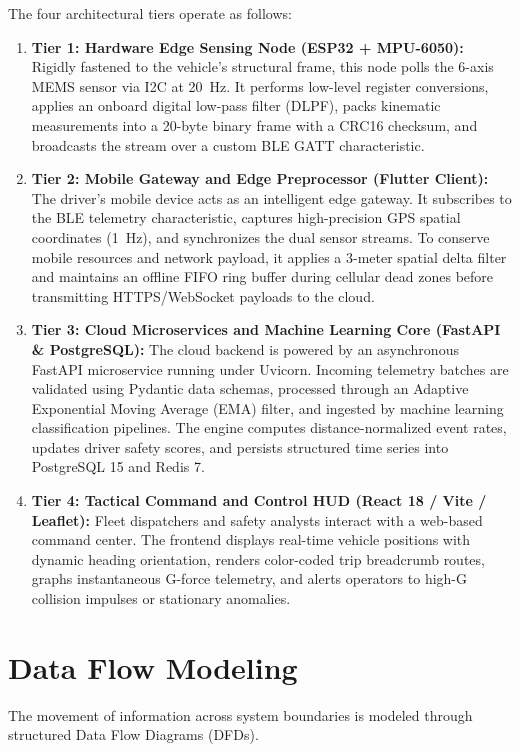 The four architectural tiers operate as follows:
\begin{enumerate}
    \item \textbf{Tier 1: Hardware Edge Sensing Node (ESP32 + MPU-6050):} 
    Rigidly fastened to the vehicle's structural frame, this node polls the 6-axis MEMS sensor via I2C at 20~Hz. It performs low-level register conversions, applies an onboard digital low-pass filter (DLPF), packs kinematic measurements into a 20-byte binary frame with a CRC16 checksum, and broadcasts the stream over a custom BLE GATT characteristic.
    
    \item \textbf{Tier 2: Mobile Gateway and Edge Preprocessor (Flutter Client):}
    The driver's mobile device acts as an intelligent edge gateway. It subscribes to the BLE telemetry characteristic, captures high-precision GPS spatial coordinates (1~Hz), and synchronizes the dual sensor streams. To conserve mobile resources and network payload, it applies a 3-meter spatial delta filter and maintains an offline FIFO ring buffer during cellular dead zones before transmitting HTTPS/WebSocket payloads to the cloud.
    
    \item \textbf{Tier 3: Cloud Microservices and Machine Learning Core (FastAPI \& PostgreSQL):}
    The cloud backend is powered by an asynchronous FastAPI microservice running under Uvicorn. Incoming telemetry batches are validated using Pydantic data schemas, processed through an Adaptive Exponential Moving Average (EMA) filter, and ingested by machine learning classification pipelines. The engine computes distance-normalized event rates, updates driver safety scores, and persists structured time series into PostgreSQL 15 and Redis 7.
    
    \item \textbf{Tier 4: Tactical Command and Control HUD (React 18 / Vite / Leaflet):}
    Fleet dispatchers and safety analysts interact with a web-based command center. The frontend displays real-time vehicle positions with dynamic heading orientation, renders color-coded trip breadcrumb routes, graphs instantaneous G-force telemetry, and alerts operators to high-G collision impulses or stationary anomalies.
\end{enumerate}

\section{Data Flow Modeling}
\label{sec:dfd}
The movement of information across system boundaries is modeled through structured Data Flow Diagrams (DFDs).

